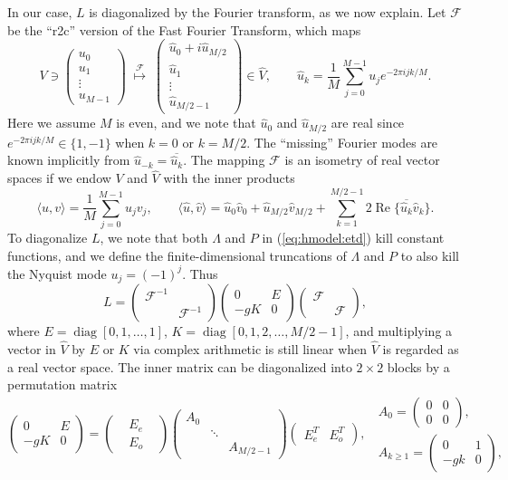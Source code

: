 \documentclass[11pt]{article}
\theoremstyle{plain}
\theoremstyle{definition}
\theoremstyle{definition}
\newcommand{\la}{\langle}
\newcommand{\opn}{\operatorname}
\newcommand{\mc}[1]{\mathcal{#1}}
\newcommand{\mat}[1]{\begin{pmatrix} #1 \end{pmatrix}}
\newcommand{\diag}{\opn{diag}}
\begin{document}
In our case, $L$ is diagonalized by the Fourier transform, as we now
explain. Let $\mc{F}$ be the ``r2c'' version of the Fast Fourier
Transform, which maps
%
%
\begin{equation}
  V \ni \mat{ u_0 \\ u_1 \\ \vdots \\ u_{M-1} } \;\overset{\mc F}\longmapsto \;
  \mat{ \hat u_0 + i\hat u_{M/2} \\ \hat u_1 \\ \vdots \\ \hat u_{M/2-1} } \in \hat V, \qquad
  \hat u_k = \frac1M\sum_{j=0}^{M-1} u_j e^{-2\pi ijk/M}.
\end{equation}
%
Here we assume $M$ is even, and we note that $\hat u_0$ and $\hat u_{M/2}$ are real
since $e^{-2\pi ijk/M}\in\{1,-1\}$ when $k=0$ or $k=M/2$. The ``missing'' Fourier modes
are known implicitly from $\hat u_{-k} = \overline{\hat u_k}$. The mapping $\mc F$ is
an isometry of real vector spaces if we endow $V$ and $\hat V$ with the inner products
%
\begin{equation}
  \big\la u, v\big\rangle = \frac1M\sum_{j=0}^{M-1}u_jv_j, \qquad
  \big\la \hat u,\hat v\big\rangle = \hat u_0\hat v_0 + \hat u_{M/2}\hat v_{M/2} +
  \sum_{k=1}^{M/2-1} 2\opn{Re}\{ \overline{\hat u_k}\hat v_k \}.
\end{equation}
%
To diagonalize $L$, we note that both $\Lambda$ and $P$ in
(\ref{eq:hmodel:etd}) kill constant functions, and we define the
finite-dimensional truncations of $\Lambda$ and $P$ to
also kill the Nyquist mode $u_j=(-1)^j$. Thus
%
\begin{equation}
L = \mat{ \mc F^{-1} \\ & \mc F^{-1} }
\mat{ 0 & E \\ -gK & 0 }\mat{ \mc F \\ & \mc F },
\end{equation}
%
where $E = \diag[0,1,\dots,1]$, $K = \diag[0,1,2,\dots,M/2-1]$, and
multiplying a vector in $\hat V$ by $E$ or $K$ via complex arithmetic
is still linear when $\hat V$ is regarded as a real vector space.
The inner matrix can be diagonalized into $2\times2$ blocks by a
permutation matrix
%
\begin{equation}\label{eq:diag:EgK}
  \mat{ 0 & E \\ -gK & 0 } =
  \mat{ & E_e & \\ & E_o & }
  \mat{ A_0 \\ & \ddots \\ & & A_{M/2-1} }
  \mat{ E_e^T & E_o^T }, \;\;
  \begin{array}{c}
    A_0=\mat{ 0 & 0 \\ 0 & 0 }, \\[10pt]
    A_{k\ge1}=\mat{ 0 & 1 \\ -gk & 0 },
    \end{array}
\end{equation}
\end{document}
